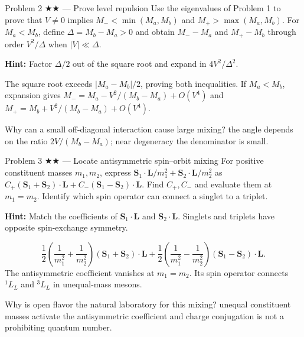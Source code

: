 \documentclass[11pt]{article}
\begin{document}
\begin{problem}{Problem 2 ★★ — Prove level repulsion}
Use the eigenvalues of Problem 1 to prove that $V\ne0$ implies
$M_-<\min(M_a,M_b)$ and $M_+>\max(M_a,M_b)$.
For $M_a<M_b$, define $\Delta=M_b-M_a>0$ and obtain
$M_--M_a$ and $M_+-M_b$ through order $V^2/\Delta$
when $|V|\ll\Delta$.

\textbf{Hint:} Factor $\Delta/2$ out of the square root and expand in
$4V^2/\Delta^2$.
\end{problem}
\begin{solution}
The square root exceeds $|M_a-M_b|/2$, proving both inequalities. If
$M_a<M_b$, expansion gives
$M_-=M_a-V^2/(M_b-M_a)+O(V^4)$ and
$M_+=M_b+V^2/(M_b-M_a)+O(V^4)$.
\end{solution}
\begin{quiz}
Why can a small off-diagonal interaction cause large mixing? \answer the angle
depends on the ratio $2V/(M_b-M_a)$; near degeneracy the denominator is small.
\end{quiz}

\begin{problem}{Problem 3 ★★ — Locate antisymmetric spin--orbit mixing}
For positive constituent masses $m_1,m_2$, express
$\bm S_1\cdot\bm L/m_1^2+\bm S_2\cdot\bm L/m_2^2$ as
$C_+(\bm S_1+\bm S_2)\cdot\bm L+C_-(\bm S_1-\bm S_2)\cdot\bm L$.
Find $C_+,C_-$ and evaluate them at $m_1=m_2$.
Identify which spin operator can connect a singlet to a triplet.

\textbf{Hint:} Match the coefficients of $\bm S_1\cdot\bm L$ and
$\bm S_2\cdot\bm L$. Singlets and triplets have opposite spin-exchange symmetry.
\end{problem}
\begin{solution}
\[
\frac12\left(\frac1{m_1^2}+\frac1{m_2^2}\right)
(\bm S_1+\bm S_2)\cdot\bm L+
\frac12\left(\frac1{m_1^2}-\frac1{m_2^2}\right)
(\bm S_1-\bm S_2)\cdot\bm L.
\]
The antisymmetric coefficient vanishes at $m_1=m_2$. Its spin operator connects
$^1L_L$ and $^3L_L$ in unequal-mass mesons.
\end{solution}
\begin{quiz}
Why is open flavor the natural laboratory for this mixing? \answer unequal
constituent masses activate the antisymmetric coefficient and charge
conjugation is not a prohibiting quantum number.
\end{quiz}
\end{document}
